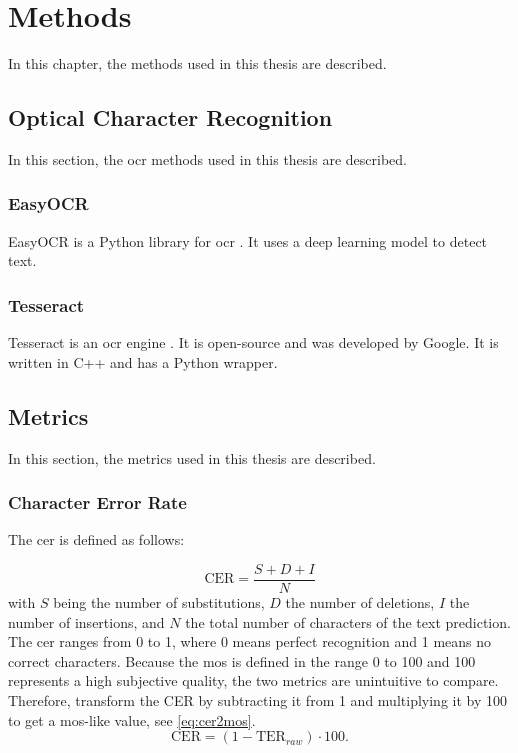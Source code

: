 \chapter{Methods}
\label{chap:methods}

In this chapter, the methods used in this thesis are described.

\section{Optical Character Recognition}
\label{sec:ocr}

In this section, the \gls{ocr} methods used in this thesis are described.

\subsection{EasyOCR}
\label{subsec:easyocr}

EasyOCR is a Python library for \gls{ocr} \cite{easyocr}. It uses a deep learning model to detect text.

\subsection{Tesseract}
\label{subsec:tesseract}

Tesseract is an \gls{ocr} engine \cite{tesseract}. It is open-source and was developed by Google. It is written in C++ and has a Python wrapper.

\section{Metrics}
\label{sec:metrics}

In this section, the metrics used in this thesis are described.

\subsection{Character Error Rate}
\label{subsec:cer}

The \gls{cer} is defined as follows:

\begin{equation}
    \text{CER} = \frac{S + D + I}{N}
    \label{eq:cer}
\end{equation}
with \(S\) being the number of substitutions, \(D\) the number of deletions, \(I\) the number of insertions, and \(N\) the total number of characters of the text prediction.
The \gls{cer} ranges from 0 to 1, where 0 means perfect recognition and 1 means no correct characters.
Because the \gls{mos} is defined in the range 0 to 100 and 100 represents a high subjective quality, the two metrics are unintuitive to compare.
Therefore, transform the CER by subtracting it from 1 and multiplying it by 100 to get a \gls{mos}-like value, see \autoref{eq:cer2mos}.
\begin{equation}
    \text{CER} = (1 - \text{TER}_{raw}) \cdot 100.
    \label{eq:cer2mos}
\end{equation}

